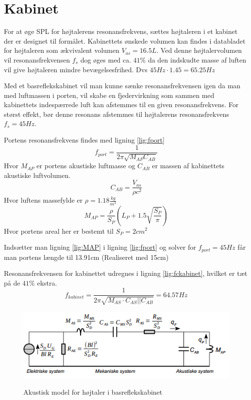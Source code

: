 \section{Kabinet}

For at øge SPL for højtalerens resonansfrekvens, sættes højtaleren i et kabinet der er designet til formålet.
Kabinettets ønskede volumen kan findes i databladet for højtaleren\cite{FW168} som ækvivalent volumen $V_{as} = 16.5L$. Ved denne højtalervolumen vil resonansfrekvensen $f_s$ dog øges med ca. $41\%$ da den indskudte masse af luften vil give højtaleren mindre bevægelsesfrihed. Dvs $45Hz\cdot1.45=65.25Hz$

Med et basreflekskabinet vil man kunne sænke resonansfrekvensen igen da man med luftmassen i porten, vil skabe en fjedervirkning som sammen med kabinettets indespærrede luft kan afstemmes til en given resonansfrekvens. For størst effekt, bør denne resonans afstemmes til højtalerens resonansfrekvens $f_s = 45Hz$.

Portens resonansfrekvens findes med ligning \ref{lig:fport}
\begin{equation}\label{lig:fport}
f_{port}=\frac{1}{2 \pi \sqrt{M_{AP} C_{AB}}}
\end{equation}
Hvor $M_{AP}$ er portens akustiske luftmasse og $C_{AB}$ er massen af kabinettets akustiske luftvolumen.
\begin{equation}\label{lig:CAB}
C_{AB}=\frac{V_{as}}{\rho c^2}
	\end{equation}
	Hvor luftens massefylde er $\rho=1.18 \frac{kg}{m^3}$ 
\begin{equation}\label{lig:MAP}
M_{AP}=\frac{\rho}{S_P} (L_P+1.5\sqrt{\frac{S_P}{\pi}})
\end{equation}	
Hvor portens areal her er bestemt til $S_P=2cm^2$

Indsætter man ligning \ref{lig:MAP} i ligning \ref{lig:fport} og solver for $f_{port}=45Hz$ får man portens længde til 13.91cm (Realiseret med 15cm)


Resonansfrekvensen for kabinettet udregnes i ligning \ref{lig:fckabinet}, hvilket er tæt på de $41\%$ ekstra.
\begin{equation}\label{lig:fckabinet}
f_{kabinet}=\frac{1}{2 \pi \sqrt{M_{AS} \cdot C_{AS}||C_{AB}}} = 64.57Hz
\end{equation}
\begin{figure}[H]
	\centering
	\includegraphics[width=\textwidth]{Pics/Akustisk_basrefleks_model.PNG}
	\label{fig:BR_a_Model}
	\caption{Akustisk model for højtaler i basreflekskabinet \cite{Elektroakustik}} 
\end{figure}
